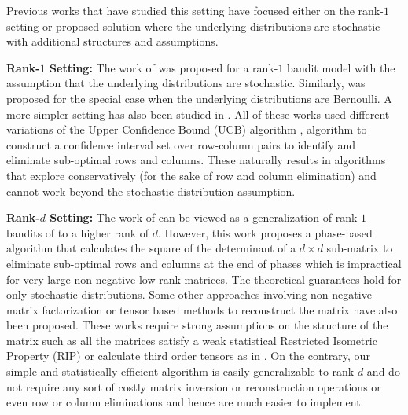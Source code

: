Previous works that have studied this setting have focused either on the rank-$1$ setting or proposed solution where the underlying distributions are stochastic with additional structures and assumptions.

\textbf{Rank-$1$ Setting:} The work of \citet{katariya2016stochastic} was proposed for a rank-$1$ bandit model with the assumption that the underlying distributions are stochastic. Similarly, \citet{katariya2017bernoulli} was proposed for the special case when the underlying distributions are Bernoulli.  A more simpler setting has also been studied in \citet{maillard2014latent}. All of these works used different variations of the Upper Confidence Bound (UCB) algorithm \cite{auer2002finite}, \citep{auer2010ucb} algorithm to construct a confidence interval set over row-column pairs to identify and eliminate sub-optimal rows and columns. These naturally results in algorithms that explore conservatively (for the sake of row and column elimination) and cannot work beyond the stochastic distribution assumption. 



\textbf{Rank-$d$ Setting:} The work of \citet{kveton2017stochastic} can be viewed as a generalization of rank-$1$ bandits of \citet{katariya2016stochastic} to a higher rank of $d$. However, this work proposes a phase-based algorithm that calculates the square of the determinant of a $d\times d$ sub-matrix to eliminate sub-optimal rows and columns at the end of phases which is impractical for very large non-negative low-rank matrices. The theoretical guarantees hold for only stochastic distributions. Some other approaches involving non-negative matrix factorization \citet{sen2016contextual} or tensor based methods \citep{gopalan2016low} to reconstruct the matrix have also been proposed. These works require strong assumptions on the structure of the matrix such as all the matrices satisfy a weak statistical Restricted Isometric Property (RIP) or calculate third order tensors as in \citet{anandkumar2014tensor}. On the contrary, our simple and statistically efficient algorithm is easily generalizable to rank-$d$ and do not require any sort of costly matrix inversion or reconstruction operations or even row or column eliminations and hence are much easier to implement. 

